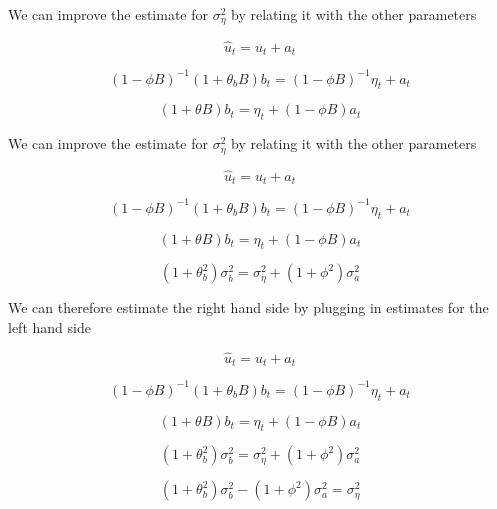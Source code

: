 \documentclass[9pt]{beamer}
\numberwithin{equation}{section}
\theoremstyle{plain}
\begin{document}
\begin{frame}[t]{We can improve the estimate for $\sigma_\eta^2$ by relating it with the other parameters}
    \begin{block}
    \centering
        $$\hat{u}_t  = u_t + a_t$$
    \end{block}\begin{block}
    \centering
        $$(1 - \phi B)^{-1}(1 + \theta_b B)b_t  = (1 - \phi B)^{-1}\eta_t + a_t$$
\end{block}
\begin{block}
    \centering
        $$(1 + \theta B)b_t = \eta_t + (1-\phi B) a_t$$ 
\end{block}





\end{frame}

\begin{frame}[t]{We can improve the estimate for $\sigma_\eta^2$ by relating it with the other parameters}
    \begin{block}
    \centering
        $$\hat{u}_t  = u_t + a_t$$
    \end{block}\begin{block}
    \centering
    $$(1 - \phi B)^{-1}(1 + \theta_b B)b_t  = (1 - \phi B)^{-1}\eta_t + a_t$$
\end{block}
\begin{block}
    \centering
        $$(1 + \theta B)b_t = \eta_t + (1-\phi B) a_t$$ 
\end{block}

\begin{block}
    \centering
    $$(1 + \theta_b^2)\sigma_b^2 = \sigma_\eta^2 + (1 + \phi^2)\sigma_a^2$$ 
\end{block}

    
\end{frame}

\begin{frame}[t]{We can therefore estimate the right hand side by plugging in estimates for the left hand side}
    \begin{block}
    \centering
        $$\hat{u}_t  = u_t + a_t$$
    \end{block}\begin{block}
    \centering
    $$(1 - \phi B)^{-1}(1 + \theta_b B)b_t  = (1 - \phi B)^{-1}\eta_t + a_t$$
\end{block}
\begin{block}
    \centering
        $$(1 + \theta B)b_t = \eta_t + (1-\phi B) a_t$$ 
\end{block}

\begin{block}
    \centering
    $$(1 + \theta_b^2)\sigma_b^2 = \sigma_\eta^2 + (1 + \phi^2)\sigma_a^2$$ 
\end{block}

\begin{block}
    \centering
    $$(1 + \theta_b^2)\sigma_b^2- (1 + \phi^2)\sigma_a^2 =  \sigma_\eta^2 $$ 
\end{block}

    
\end{frame}
\end{document}
